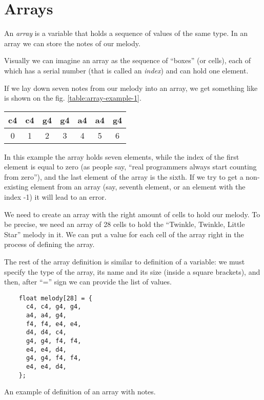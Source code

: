 \documentclass[../sparc.tex]{subfiles}
\begin{document}
\section{Arrays}

An \emph{array} is a variable that holds a sequence of values of the same type.
In an array we can store the notes of our melody.

Visually we can imagine an array as the sequence of ``boxes'' (or cells), each
of which has a serial number (that is called an \emph{index}) and can hold one
element.

If we lay down seven notes from our melody into an array, we get something like
is shown on the fig. \ref{table:array-example-1}.

\begin{tabular}{|p{1cm}|p{1cm}|p{1cm}|p{1cm}|p{1cm}|p{1cm}|p{1cm}|}
  \hline
  c4 & c4 & g4 & g4 & a4 & a4 & g4 \\
  \hline
  \multicolumn{1}{c}{0}
  & \multicolumn{1}{c}{1}
  & \multicolumn{1}{c}{2}
  & \multicolumn{1}{c}{3}
  & \multicolumn{1}{c}{4}
  & \multicolumn{1}{c}{5}
  & \multicolumn{1}{c}{6}
  \label{table:array-example-1}
\end{tabular}

In this example the array holds seven elements, while the index of the first
element is equal to zero (as people say, ``real programmers always start
counting from zero''), and the last element of the array is the sixth.  If we
try to get a non-existing element from an array (say, seventh element, or an
element with the index -1) it will lead to an error.

We need to create an array with the right amount of cells to hold our melody.
To be precise, we need an array of 28 cells to hold the ``Twinkle, Twinkle,
Little Star'' melody in it.  We can put a value for each cell of the array right
in the process of defining the array.

The rest of the array definition is similar to definition of a variable: we must
specify the type of the array, its name and its size (inside a square brackets),
and then, after ``='' sign we can provide the list of values.

\begin{listing}[ht]
  \begin{verbatim}
    float melody[28] = {
      c4, c4, g4, g4,
      a4, a4, g4,
      f4, f4, e4, e4,
      d4, d4, c4,
      g4, g4, f4, f4,
      e4, e4, d4,
      g4, g4, f4, f4,
      e4, e4, d4,
    };
  \end{verbatim}
  \label{listing:music-array-example-1}
  \caption{An example of definition of an array with notes.}
\end{listing}
\end{document}
